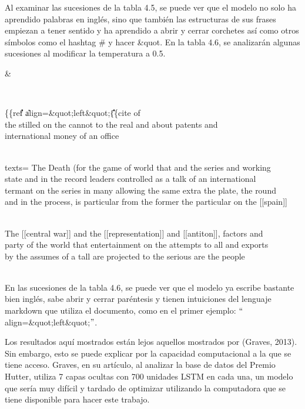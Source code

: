 \vspace{1em}

Al examinar las sucesiones de la tabla 4.5, se puede ver que el modelo no solo ha aprendido palabras en inglés, sino que también las estructuras de sus frases empiezan a tener sentido y ha aprendido a abrir y cerrar corchetes así como otros símbolos como el hashtag # y hacer \&quot. En la tabla 4.6, se analizarán algunas sucesiones al modificar la temperatura a 0.5.


\begin{table}[htbp]
\begin{center}
\begin{tabular}{&}

\\ \hline

\{\{ref\| \| \|\| \|\| \|\- \| \| align=\&quot;left\&quot;\|\| \|\| \|\| \|\| \|\| \|\| \|\| \{\{cite of \\ the stilled on the cannot to the real and about patents and \\ international money of an office
\\ 
\\ \hline

texts= The Death (for the game of world that and the series and working \\ state and in the record leaders controlled as a talk of an international \\ termant on the series in many allowing the same extra the plate, the round \\ and in the process, is particular from the former the particular on the [[spain]]
\\ 
\\ \hline

The [[central war]] and the [[representation]] and [[antiton]], factors and \\ party of the world that entertainment on the attempts to all and exports \\ by the assumes of a tall are projected to the serious are the people
\\ 
\\ \hline


\end{tabular}
\caption{Segundo modelo de Hutter: temperatura 0.5}
\label{sucesiones hutter 1}
\end{center}
\end{table}

En las sucesiones de la tabla 4.6, se puede ver que el modelo ya escribe bastante bien inglés, sabe abrir y cerrar paréntesis y  tienen intuiciones del lenguaje markdown que utiliza el documento, como en el primer ejemplo: $``$align=\&quot;left\&quot;$"$. 

\vspace{1em}

Los resultados aquí mostrados están lejos aquellos mostrados por (Graves, 2013). Sin embargo, esto se puede explicar por la capacidad computacional a la que se tiene acceso. Graves, en su artículo, al analizar la base de datos del Premio Hutter, utiliza 7 capas ocultas con 700 unidades LSTM en cada una, un modelo que sería muy difícil y tardado de optimizar utilizando la computadora que se tiene disponible para hacer este trabajo.
\cite{DBLP:journals/corr/Graves13}